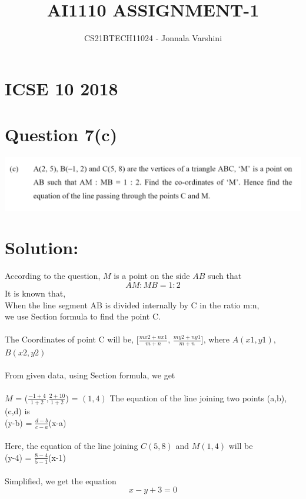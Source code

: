 \documentclass[12pt]{article}
\title{AI1110 ASSIGNMENT-1}
\author{CS21BTECH11024 - Jonnala Varshini}
\begin{document}
  \maketitle
  \section*{ICSE 10 2018}
  \section*{Question 7(c)}
  
  \includegraphics[width=\textwidth]{prv1a.png}
  \section*{Solution:}
 According to the question, $M$ is a point on the side $AB$ such that $$AM : MB = 1 : 2$$
  It is known that, \\
  When the line segment AB is divided internally by C in the ratio m:n,\\
  we use Section formula to find the point C.\\\\
  The Coordinates of point C will be,
  [$\frac{mx2+nx1}{m+n}$, $\frac{my2+ny1}{m+n}$], where $A(x1,y1)$,$B(x2,y2)$ \\\\
  From given data, using Section formula, we get\\\\
    $M$ = ($\frac{-1+4}{1+2}$,$\frac{2+10}{1+2}$) = $(1,4)$\newpage
  The equation of the line joining two points (a,b),(c,d) is \\
        (y-b) = {$\frac{d-b}{c-a}$}(x-a)\\\\
  Here, the equation of the line joining $C(5,8)$ and $M(1,4)$ will be\\
      (y-4) = $\frac{8-4}{5-1}$(x-1) \\\\
  Simplified, we get the equation $$x-y+3=0$$
\end{document}
